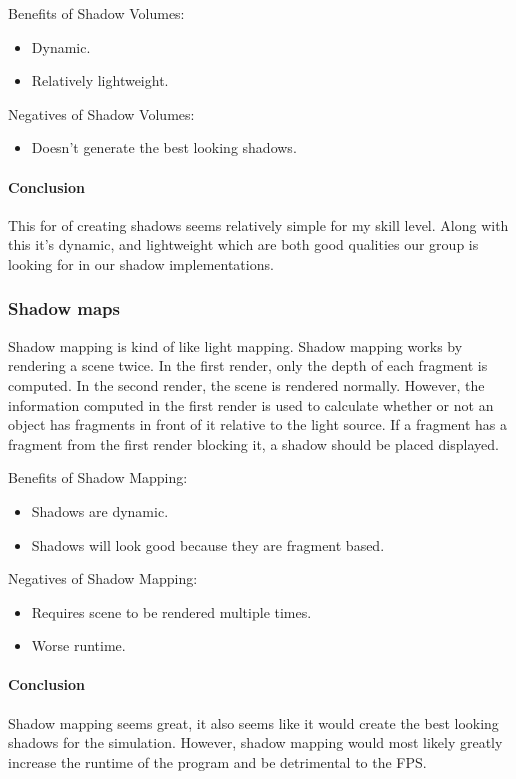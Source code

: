 \documentclass[10pt,journal,compsoc,draftclsnofoot]{IEEEtran}
\begin{document}
Benefits of Shadow Volumes:
\begin{itemize}
\item Dynamic.
\item Relatively lightweight.
\end{itemize}

Negatives of Shadow Volumes:
\begin{itemize}
\item Doesn't generate the best looking shadows.
\end{itemize}

\paragraph{Conclusion}
\vspace{3mm}
This for of creating shadows seems relatively simple for my skill level.
Along with this it's dynamic, and lightweight which are both good qualities our group is looking for in our shadow implementations.

\subsubsection{Shadow maps}
Shadow mapping is kind of like light mapping.
Shadow mapping works by rendering a scene twice.
In the first render, only the depth of each fragment is computed.
In the second render, the scene is rendered normally.
However, the information computed in the first render is used to calculate whether or not an object has fragments in front of it relative to the light source.
If a fragment has a fragment from the first render blocking it, a shadow should be placed displayed. \cite{shadowMapping}

Benefits of Shadow Mapping:
\begin{itemize}
\item Shadows are dynamic.
\item Shadows will look good because they are fragment based.
\end{itemize}

Negatives of Shadow Mapping:
\begin{itemize}
\item Requires scene to be rendered multiple times.
\item Worse runtime.
\end{itemize}

\paragraph{Conclusion}
\vspace{3mm}
Shadow mapping seems great, it also seems like it would create the best looking shadows for the simulation.
However, shadow mapping would most likely greatly increase the runtime of the program and be detrimental to the FPS.
\end{document}
